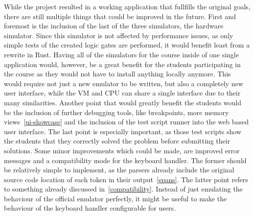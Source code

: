 \label{future-work}
While the project resulted in a working application that fullfills the original goals, there are still multiple things that could be improved in the future.
First and foremost is the inclusion of the last of the three simulators, the hardware simulator.
Since this simulator is not affected by performance issues, as only simple tests of the created logic gates are performed, it would benefit least from a rewrite in Rust.
Having all of the simulators for the course inside of one single application would, however, be a great benefit for the students participating in the course as they would not have to install anything locally anymore.
This would require not just a new emulator to be written, but also a completely new user interface, while the VM and CPU can share a single interface due to their many similarities.
Another point that would greatly benefit the students would be the inclusion of further debugging tools, like breakpoints, more memory views~\ref{ui-showcase} and the inclusion of the test script runner into the web based user interface.
The last point is especially important, as those test scripts show the students that they correctly solved the problem before submitting their solutions.
Some minor improvements which could be made, are improved error messages and a compatibility mode for the keyboard handler.
The former should be relatively simple to implement, as the parsers already include the original source code location of each token in their output~\ref{spans}.
The latter point refers to something already discussed in~\cref{compatibility}.
Instead of just emulating the behaviour of the official emulator perfectly, it might be useful to make the behaviour of the keyboard handler configurable for users.

